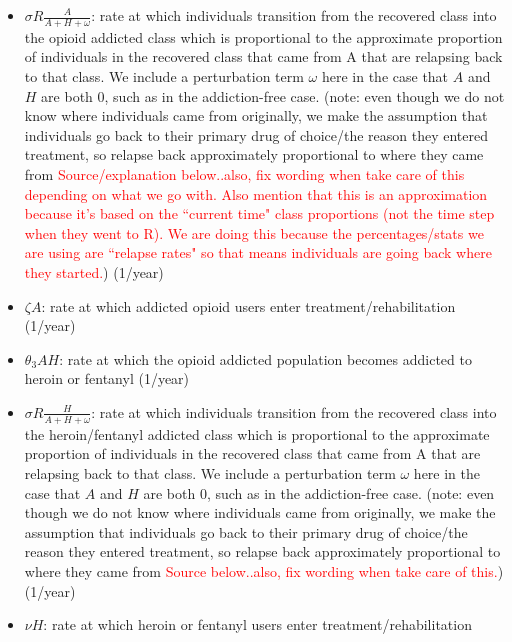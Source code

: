 \documentclass[12pt]{article}
\begin{document}
\begin{itemize}
\item $\sigma R \frac{A}{A+H+\omega}$: rate at which individuals transition from the recovered class into the opioid addicted class which is proportional to the approximate proportion of individuals in the recovered class that came from A that are relapsing back to that class. We include a perturbation term $\omega$ here in the case that $A$ and $H$ are both 0, such as in the addiction-free case. (note: even though we do not know where individuals came from originally, we make the assumption that individuals go back to their primary drug of choice/the reason they entered treatment, so relapse back approximately proportional to where they came from \textcolor{red}{Source/explanation below..also, fix wording when take care of this depending on what we go with. Also mention that this is an approximation because it's based on the ``current time" class proportions (not the time step when they went to R). We are doing this because the percentages/stats we are using are ``relapse rates" so that means individuals are going back where they started.}) (1/year)
\item $\zeta A$: rate at which addicted opioid users enter treatment/rehabilitation (1/year)
\item $\theta_3 AH$: rate at which the opioid addicted population becomes addicted to heroin or fentanyl  (1/year)
\item $\sigma R \frac{H}{A+H+\omega}$: rate at which individuals transition from the recovered class into the heroin/fentanyl addicted class which is proportional to the approximate proportion of individuals in the recovered class that came from A that are relapsing back to that class. We include a perturbation term $\omega$ here in the case that $A$ and $H$ are both 0, such as in the addiction-free case. (note: even though we do not know where individuals came from originally, we make the assumption that individuals go back to their primary drug of choice/the reason they entered treatment, so relapse back approximately proportional to where they came from \textcolor{red}{Source below..also, fix wording when take care of this.}) (1/year)
\item $\nu H$: rate at which heroin or fentanyl users enter treatment/rehabilitation 
\end{itemize} 
\end{document}
